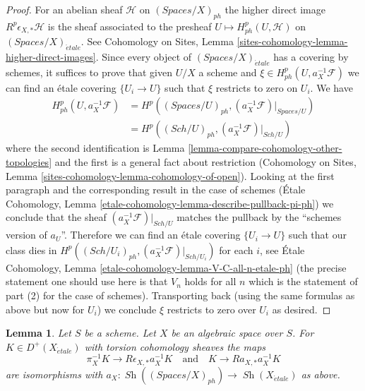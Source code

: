 \documentclass{stacks-project}
\theoremstyle{plain}
\newtheorem{lemma}[subsection]{Lemma}
\theoremstyle{definition}
\theoremstyle{remark}
\numberwithin{equation}{subsection}
\def\Sch{\mathit{Sch}}
\def\Sh{\mathop{\mathit{Sh}}\nolimits}
\def\etale{{\acute{e}tale}}
\begin{document}
\begin{proof}
\medskip\noindent
For an abelian sheaf $\mathcal{H}$ on $(\textit{Spaces}/X)_{ph}$ the
higher direct image $R^p\epsilon_{X, *}\mathcal{H}$ is the sheaf
associated to the presheaf $U \mapsto H^p_{ph}(U, \mathcal{H})$
on $(\textit{Spaces}/X)_\etale$. See
Cohomology on Sites, Lemma \ref{sites-cohomology-lemma-higher-direct-images}.
Since every object of $(\textit{Spaces}/X)_\etale$ has a covering
by schemes, it suffices to prove that given $U/X$ a scheme and
$\xi \in H^p_{ph}(U, a_X^{-1}\mathcal{F})$ we can find
an \'etale covering $\{U_i \to U\}$ such that $\xi$
restricts to zero on $U_i$. We have
\begin{align*}
H^p_{ph}(U, a_X^{-1}\mathcal{F})
& =
H^p((\textit{Spaces}/U)_{ph}, (a_X^{-1}\mathcal{F})|_{\textit{Spaces}/U}) \\
& =
H^p((\Sch/U)_{ph}, (a_X^{-1}\mathcal{F})|_{\Sch/U})
\end{align*}
where the second identification is
Lemma \ref{lemma-compare-cohomology-other-topologies}
and the first is a general fact about restriction
(Cohomology on Sites, Lemma \ref{sites-cohomology-lemma-cohomology-of-open}).
Looking at the first paragraph and the corresponding result in the
case of schemes (\'Etale Cohomology, Lemma
\ref{etale-cohomology-lemma-describe-pullback-pi-ph})
we conclude that the sheaf $(a_X^{-1}\mathcal{F})|_{\Sch/U}$
matches the pullback by the ``schemes version of $a_U$''.
Therefore we can find an \'etale covering
$\{U_i \to U\}$ such that our class dies in
$H^p((\Sch/U_i)_{ph}, (a_X^{-1}\mathcal{F})|_{\Sch/U_i})$
for each $i$, see
\'Etale Cohomology, Lemma \ref{etale-cohomology-lemma-V-C-all-n-etale-ph}
(the precise statement one should use here is that $V_n$ holds for all $n$
which is the statement of part (2) for the case of schemes).
Transporting back (using the same formulas as above but now for
$U_i$) we conclude $\xi$ restricts to zero over $U_i$ as desired.
\end{proof}

\begin{lemma}
\label{lemma-cohomological-descent-etale-ph}
Let $S$ be a scheme. Let $X$ be an algebraic space over $S$.
For $K \in D^+(X_\etale)$ with torsion cohomology sheaves the maps
$$
\pi_X^{-1}K \longrightarrow R\epsilon_{X, *}a_X^{-1}K
\quad\text{and}\quad
K \longrightarrow Ra_{X, *}a_X^{-1}K
$$
are isomorphisms with
$a_X : \Sh((\textit{Spaces}/X)_{ph}) \to \Sh(X_\etale)$ as above.
\end{lemma}
\end{document}
